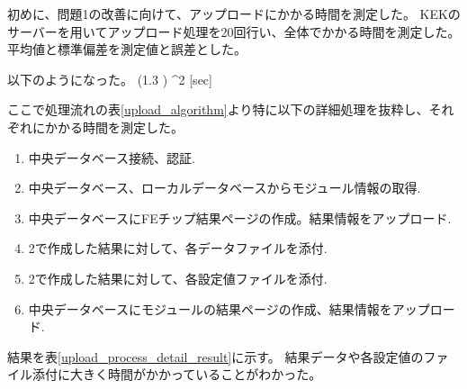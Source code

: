 初めに、問題1の改善に向けて、アップロードにかかる時間を測定した。
KEKのサーバーを用いてアップロード処理を20回行い、全体でかかる時間を測定した。
平均値と標準偏差を測定値と誤差とした。

以下のようになった。
\bbb
  (1.3 ) ^2 [{\rm sec}]
\eee

ここで処理流れの表\ref{upload_algorithm}より特に以下の詳細処理を抜粋し、それぞれにかかる時間を測定した。

\begin{enumerate}
  \item 中央データベース接続、認証.
  \item 中央データベース、ローカルデータベースからモジュール情報の取得.
  \item 中央データベースにFEチップ結果ページの作成。結果情報をアップロード.
  \item 2で作成した結果に対して、各データファイルを添付.
  \item 2で作成した結果に対して、各設定値ファイルを添付.
  \item 中央データベースにモジュールの結果ページの作成、結果情報をアップロード.
\end{enumerate}

結果を表\ref{upload_process_detail_result}に示す。
結果データや各設定値のファイル添付に大きく時間がかかっていることがわかった。

